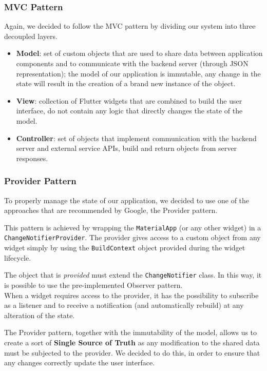 \subsubsection{MVC Pattern}
Again, we decided to follow the MVC pattern by dividing our system into three decoupled layers.
\begin{itemize}
      \item \textbf{Model}:
            set of custom objects that are used to share data between application components and to communicate with the backend server (through JSON representation);
            the model of our application is immutable, any change in the state will result in the creation of a brand new instance of the object.
      \item \textbf{View}:
            collection of Flutter widgets that are combined to build the user interface, do not contain any logic that directly changes the state of the model.
      \item \textbf{Controller}:
            set of objects that implement communication with the backend server and external service APIs, build and return objects from server responses.
\end{itemize}

\subsubsection{Provider Pattern}
To properly manage the state of our application, we decided to use one of the approaches that are recommended by Google, the Provider pattern.

This pattern is achieved by wrapping the \texttt{MaterialApp} (or any other widget) in a \texttt{ChangeNotifierProvider}.
The provider gives access to a custom object from any widget simply by using the \texttt{BuildContext} object provided during the widget lifecycle.

The object that is \emph{provided} must extend the \texttt{ChangeNotifier} class. In this way, it is possible to use the pre-implemented Observer pattern.\\
When a widget requires access to the provider, it has the possibility to subscribe as a listener and to receive a notification (and automatically rebuild) at any alteration of the state.

The Provider pattern, together with the immutability of the model, allows us to create a sort of \textbf{Single Source of Truth} as any modification to the shared data must be subjected to the provider.
We decided to do this, in order to ensure that any changes correctly update the user interface.

